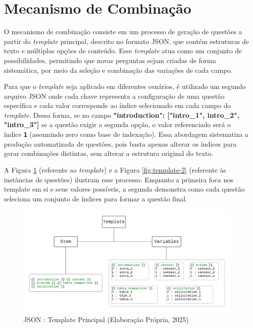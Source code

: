 \section{Mecanismo de Combinação}

O mecanismo de combinação consiste em um processo de geração de questões a partir do \textit{template} principal, descrito no formato JSON, que contém estruturas de texto e múltiplas opções de conteúdo. Esse \textit{template} atua como um conjunto de possibilidades, permitindo que novas perguntas sejam criadas de forma sistemática, por meio da seleção e combinação das variações de cada campo.

Para que o \textit{template} seja aplicado em diferentes cenários, é utilizado um segundo arquivo JSON onde cada chave representa a configuração de uma questão específica e cada valor corresponde ao índice selecionado em cada campo do \textit{template}. Dessa forma, se no campo \textbf{"introduction": ["intro\_1", intro\_2", "intro\_3"]} se a questão exigir a segunda opção, o valor referenciado será o índice \texttt{\textbf{1}} (assumindo zero como base de indexação). Essa abordagem sistematiza a produção automatizada de questões, pois basta apenas alterar os índices para gerar combinações distintas, sem alterar a estrutura original do texto.

A Figura \ref{fig:template-1} (referente ao \textit{template}) e a Figura \ref{fig:template-2} (referente às instâncias de questões) ilustram esse processo. Enquanto a primeira foca nos template em si e seus valores possíveis, a segunda demonstra como cada questão seleciona um conjunto de índices para formar a questão final. 

\begin{figure}[ht]
	\centering
	\includegraphics[width=16cm]{./imagens/capitulo5/template-1}
	\caption{JSON : Template Principal (Elaboração Própria, 2025) }
	\label{fig:template-1}
\end{figure}

